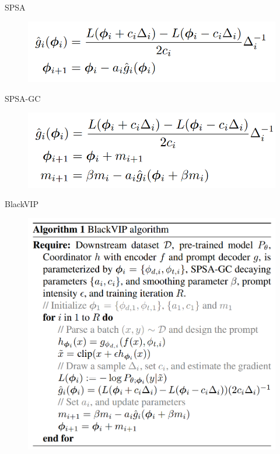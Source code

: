 \documentclass{beamer}
\begin{document}
\begin{frame}{SPSA}
    \begin{figure}[l]
        \centering
        \includegraphics[width=\textwidth]{pic/3.png}
    \end{figure}
\end{frame}

\begin{frame}{SPSA-GC}
    \begin{figure}[l]
        \centering
        \includegraphics[width=\textwidth]{pic/4.png}
    \end{figure}
\end{frame}

\begin{frame}{BlackVIP}
    \begin{figure}[l]
        \centering
        \includegraphics[height=.8\textheight]{pic/5.png}
    \end{figure}
\end{frame}
\end{document}
